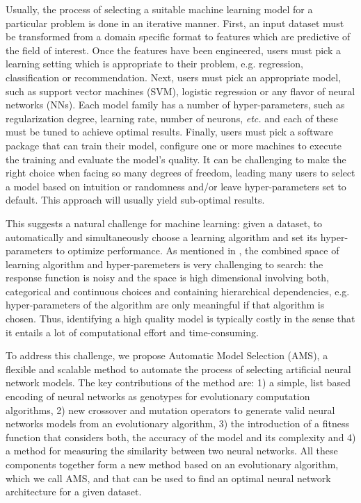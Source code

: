 \documentclass[preprint,12pt]{elsarticle}%
\begin{document}
Usually, the process of selecting a suitable machine learning model for a particular problem is done in an iterative manner. First, an input dataset must be transformed from a domain specific format to features which are predictive of the field of interest. Once the features have been engineered, users must pick a learning setting which is appropriate to their problem, e.g. regression, classification or recommendation. Next, users must pick an appropriate model, such as support vector machines (SVM), logistic regression or any flavor of neural networks (NNs). Each model family has a number of hyper-parameters, such as regularization degree, learning rate, number of neurons, \textit{etc.} and each of these must be tuned to achieve optimal results. Finally, users must pick a software package that can train their model, configure one or more machines to execute the training and evaluate the model's quality. It can be challenging to make the right choice when facing so many degrees of freedom, leading many users to select a model based on intuition or randomness and/or leave hyper-parameters set to default. This approach will usually yield sub-optimal results.

This suggests a natural challenge for machine learning: given a dataset, to automatically and simultaneously choose a learning algorithm and set its hyper-parameters to optimize performance. As mentioned in \cite{Hall2009}, the combined space of learning algorithm and hyper-paremeters is very challenging to search: the response function is noisy and the space is high dimensional involving both, categorical and continuous choices and containing hierarchical dependencies, e.g. hyper-parameters of the algorithm are only meaningful if that algorithm is chosen. Thus, identifying a high quality model is typically costly in the sense that it entails a lot of computational effort and time-consuming.

To address this challenge, we propose Automatic Model Selection (AMS), a flexible and scalable method to automate the process of selecting artificial neural network models. The key contributions of the method are: 1) a simple, list based encoding of neural networks as genotypes for evolutionary computation algorithms, 2) new crossover and mutation operators to generate valid neural networks models from an evolutionary algorithm, 3) the introduction of a fitness function that considers both, the accuracy of the model and its complexity and 4) a method for measuring the similarity between two neural networks. All these components together form a new method based on an evolutionary algorithm, which we call AMS, and that can be used to find an optimal neural network architecture for a given dataset.
\end{document}
